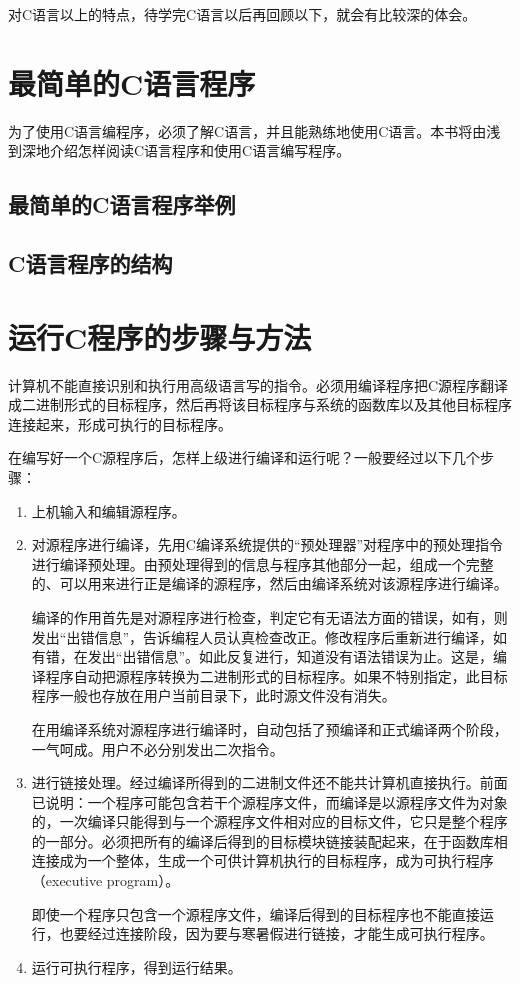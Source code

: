对C语言以上的特点，待学完C语言以后再回顾以下，就会有比较深的体会。

\section{最简单的C语言程序}

为了使用C语言编程序，必须了解C语言，并且能熟练地使用C语言。本书将由浅到深地介绍怎样阅读C语言程序和使用C语言编写程序。

\subsection{最简单的C语言程序举例}

\subsection{C语言程序的结构}
\section{运行C程序的步骤与方法}

 计算机不能直接识别和执行用高级语言写的指令。必须用编译程序把C源程序翻译成二进制形式的目标程序，然后再将该目标程序与系统的函数库以及其他目标程序连接起来，形成可执行的目标程序。

 在编写好一个C源程序后，怎样上级进行编译和运行呢？一般要经过以下几个步骤：
\begin{enumerate}
	\item 	上机输入和编辑源程序。
	\item 对源程序进行编译，先用C编译系统提供的“预处理器”对程序中的预处理指令进行编译预处理。由预处理得到的信息与程序其他部分一起，组成一个完整的、可以用来进行正是编译的源程序，然后由编译系统对该源程序进行编译。

 编译的作用首先是对源程序进行检查，判定它有无语法方面的错误，如有，则发出“出错信息”，告诉编程人员认真检查改正。修改程序后重新进行编译，如有错，在发出“出错信息”。如此反复进行，知道没有语法错误为止。这是，编译程序自动把源程序转换为二进制形式的目标程序。如果不特别指定，此目标程序一般也存放在用户当前目录下，此时源文件没有消失。

 在用编译系统对源程序进行编译时，自动包括了预编译和正式编译两个阶段，一气呵成。用户不必分别发出二次指令。

	\item 进行链接处理。经过编译所得到的二进制文件还不能共计算机直接执行。前面已说明：一个程序可能包含若干个源程序文件，而编译是以源程序文件为对象的，一次编译只能得到与一个源程序文件相对应的目标文件，它只是整个程序的一部分。必须把所有的编译后得到的目标模块链接装配起来，在于函数库相连接成为一个整体，生成一个可供计算机执行的目标程序，成为可执行程序（executive program）。

 即使一个程序只包含一个源程序文件，编译后得到的目标程序也不能直接运行，也要经过连接阶段，因为要与寒暑假进行链接，才能生成可执行程序。
	\item 运行可执行程序，得到运行结果。
\end{enumerate}

